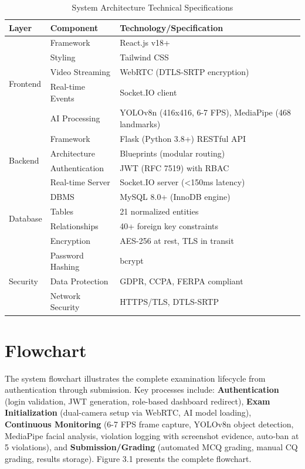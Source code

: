 \begin{table}[ht]
\centering
\caption{System Architecture Technical Specifications}
\label{tab:tech_specs}
\begin{tabular}{|l|l|p{7cm}|}
\hline
\textbf{Layer} & \textbf{Component} & \textbf{Technology/Specification} \\
\hline
\multirow{5}{*}{Frontend} & Framework & React.js v18+ \\
\cline{2-3}
& Styling & Tailwind CSS \\
\cline{2-3}
& Video Streaming & WebRTC (DTLS-SRTP encryption) \\
\cline{2-3}
& Real-time Events & Socket.IO client \\
\cline{2-3}
& AI Processing & YOLOv8n (416x416, 6-7 FPS), MediaPipe (468 landmarks) \\
\hline
\multirow{4}{*}{Backend} & Framework & Flask (Python 3.8+) RESTful API \\
\cline{2-3}
& Architecture & Blueprints (modular routing) \\
\cline{2-3}
& Authentication & JWT (RFC 7519) with RBAC \\
\cline{2-3}
& Real-time Server & Socket.IO server (<150ms latency) \\
\hline
\multirow{4}{*}{Database} & DBMS & MySQL 8.0+ (InnoDB engine) \\
\cline{2-3}
& Tables & 21 normalized entities \\
\cline{2-3}
& Relationships & 40+ foreign key constraints \\
\cline{2-3}
& Encryption & AES-256 at rest, TLS in transit \\
\hline
\multirow{3}{*}{Security} & Password Hashing & bcrypt \\
\cline{2-3}
& Data Protection & GDPR, CCPA, FERPA compliant \\
\cline{2-3}
& Network Security & HTTPS/TLS, DTLS-SRTP \\
\hline
\end{tabular}
\end{table}

\section{Flowchart}

The system flowchart illustrates the complete examination lifecycle from authentication through submission. Key processes include: \textbf{Authentication} (login validation, JWT generation, role-based dashboard redirect), \textbf{Exam Initialization} (dual-camera setup via WebRTC, AI model loading), \textbf{Continuous Monitoring} (6-7 FPS frame capture, YOLOv8n object detection, MediaPipe facial analysis, violation logging with screenshot evidence, auto-ban at 5 violations), and \textbf{Submission/Grading} (automated MCQ grading, manual CQ grading, results storage). Figure 3.1 presents the complete flowchart.

